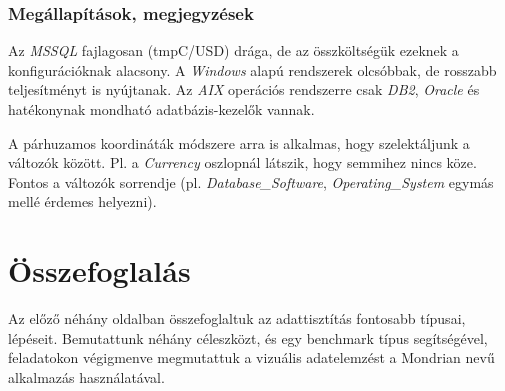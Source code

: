 \documentclass[a4paper,10pt,titlepage]{article}
\begin{document}
\subsubsection*{Megállapítások, megjegyzések}
Az \emph{MSSQL} fajlagosan (tmpC/USD) drága, de az összköltségük ezeknek a konfigurációknak alacsony. A \emph{Windows} alapú rendszerek olcsóbbak, de rosszabb teljesítményt is nyújtanak. Az \emph{AIX} operációs rendszerre csak \emph{DB2}, \emph{Oracle} és hatékonynak mondható adatbázis-kezelők vannak.

A párhuzamos koordináták módszere arra is alkalmas, hogy szelektáljunk a változók között. Pl. a \emph{Currency} oszlopnál látszik, hogy semmihez nincs köze. Fontos a változók sorrendje (pl. \emph{Database\_Software}, \emph{Operating\_System} egymás mellé érdemes helyezni).

\section{Összefoglalás}

Az előző néhány oldalban összefoglaltuk az adattisztítás fontosabb típusai, lépéseit. Bemutattunk néhány céleszközt, és egy benchmark típus segítségével, feladatokon végigmenve megmutattuk a vizuális adatelemzést a Mondrian nevű alkalmazás használatával.
\end{document}
